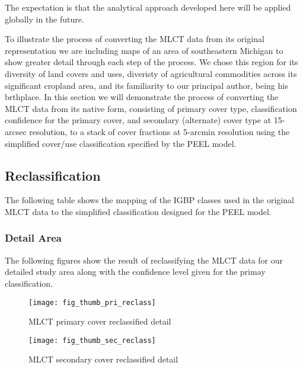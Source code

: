 The expectation is that the analytical approach developed here will be
applied globally in the future.

To illustrate the process of converting the MLCT data from its
original representation we are including maps of an area of
southeastern Michigan to show greater detail through each step of the
process.  We chose this region for its diversity of land covers and
uses, diveristy of agricultural commodities across its significant
cropland area, and its familiarity to our principal author, being his
brthplace.  In this section we will demonstrate the process of
converting the MLCT data from its native form, consisting of primary
cover type, classification confidence for the primary cover, and
secondary (alternate) cover type at 15-arcsec resolution, to a stack
of cover fractions at 5-arcmin resolution using the simplified
cover/use classification specified by the PEEL model. 

\subsection{Reclassification}
\label{sec:mlct-reclass}

The following table shows the mapping of the IGBP classes used in the
original MLCT data to the simplified classification designed for the
PEEL model.




\subsubsection{Detail Area}
\label{sec:reclass-detail-area}


The following figures show the result of reclassifying the MLCT data
for our detailed study area along with the confidence level given for
the primay classification.

\begin{figure} 
\begin{center}
  

\texttt{[image: fig\_thumb\_pri\_reclass]}
\end{center} 
\caption{MLCT primary cover reclassified detail} 
\label{fig:thumb_pri_reclass} 
\end{figure} 


\begin{figure} 
\begin{center}
  

\texttt{[image: fig\_thumb\_sec\_reclass]}
\end{center} 
\caption{MLCT secondary cover reclassified detail} 
\label{fig:thumb_sec_reclass} 
\end{figure} 



